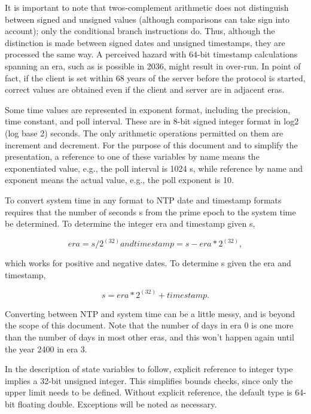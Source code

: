 It is important to note that twos-complement arithmetic does not
distinguish between signed and unsigned values (although comparisons
can take sign into account); only the conditional branch instructions
do. Thus, although the distinction is made between signed dates and
unsigned timestamps, they are processed the same way. A perceived
hazard with 64-bit timestamp calculations spanning an era, such as is
possible in 2036, might result in over-run. In point of fact, if the
client is set within 68 years of the server before the protocol is
started, correct values are obtained even if the client and server
are in adjacent eras.

Some time values are represented in exponent format, including the
precision, time constant, and poll interval. These are in 8-bit
signed integer format in log2 (log base 2) seconds. The only
arithmetic operations permitted on them are increment and decrement.
For the purpose of this document and to simplify the presentation, a
reference to one of these variables by name means the exponentiated
value, e.g., the poll interval is 1024 s, while reference by name and
exponent means the actual value, e.g., the poll exponent is 10.

To convert system time in any format to NTP date and timestamp
formats requires that the number of seconds s from the prime epoch to
the system time be determined. To determine the integer era and
timestamp given s,

$$
era = s / 2^(32) and timestamp = s - era * 2^(32),
$$

which works for positive and negative dates. To determine s given
the era and timestamp,

$$
s = era * 2^(32) + timestamp.
$$

Converting between NTP and system time can be a little messy, and is
beyond the scope of this document. Note that the number of days in
era 0 is one more than the number of days in most other eras, and
this won’t happen again until the year 2400 in era 3.

In the description of state variables to follow, explicit reference
to integer type implies a 32-bit unsigned integer. This simplifies
bounds checks, since only the upper limit needs to be defined.
Without explicit reference, the default type is 64-bit floating
double. Exceptions will be noted as necessary.

